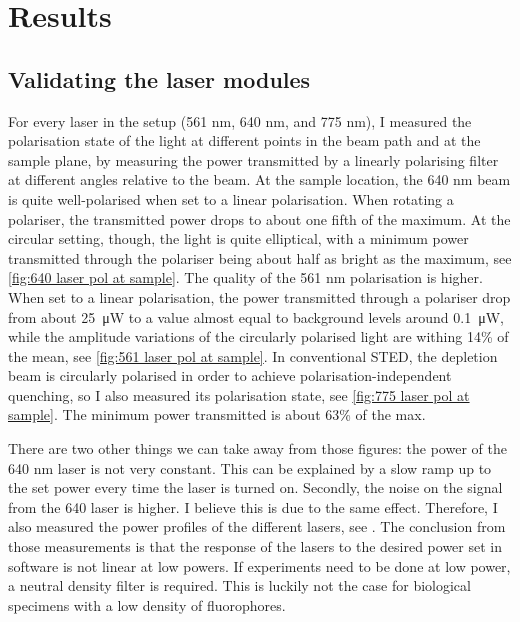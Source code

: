 \chapter{Results}

\section{Validating the laser modules}

For every laser in the setup (561 nm, 640 nm, and 775 nm), I measured the polarisation state of the light at different points in the beam path and at the sample plane, by measuring the power transmitted by a linearly polarising filter at different angles relative to the beam. At the sample location, the 640 nm beam is quite well-polarised when set to a linear polarisation. When rotating a polariser, the transmitted power drops to about one fifth of the maximum. At the circular setting, though, the light is quite elliptical, with a minimum power transmitted through the polariser being about half as bright as the maximum, see \autoref{fig:640 laser pol at sample}. The quality of the 561 nm polarisation is higher. When set to a linear polarisation, the power transmitted through a polariser drop from about \SI{25}{\micro W} to a value almost equal to background levels around \SI{0.1}{\micro W}, while the amplitude variations of the circularly polarised light are withing 14\% of the mean, see \autoref{fig:561 laser pol at sample}. In conventional STED, the depletion beam is circularly polarised in order to achieve polarisation-independent quenching, so I also measured its polarisation state, see \autoref{fig:775 laser pol at sample}. The minimum power transmitted is about 63\% of the max.   

There are two other things we can take away from those figures: the power of the 640 nm laser is not very constant. This can be explained by a slow ramp up to the set power every time the laser is turned on. Secondly, the noise on the signal from the 640 laser is higher. I believe this is due to the same effect. Therefore, I also measured the power profiles of the different lasers, see . The conclusion from those measurements is that the response of the lasers to the desired power set in software is not linear at low powers. If experiments need to be done at low power, a neutral density filter is required. This is luckily not the case for biological specimens with a low density of fluorophores.

